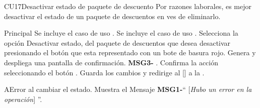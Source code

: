 \begin{UseCase}{CU17}{Desactivar estado de paquete de descuento}{
		Por razones laborales, es mejor desactivar el estado de un paquete de descuentos en ves de eliminarlo.
	}
	\end{UseCase}




	\begin{UCtrayectoria}{Principal}
		\UCpaso Se incluye el caso de uso .
		\UCpaso Se incluye el caso de uso .
		\UCpaso[\UCactor] Selecciona la opción Desactivar estado, del paquete de descuentos que desea desactivar presionando el botón  que esta representado con un bote de basura rojo.		
		\UCpaso Genera y despliega una pantalla de confirmación.  {\bf MSG3-} .
		\UCpaso[\UCactor] Confirma la acción seleccionando el botón . 
		\UCpaso Guarda los cambios y redirige al [\UCactor] a la  .
	\end{UCtrayectoria}




\begin{UCtrayectoriaA}{A}{Error al cambiar el estado.}
			\UCpaso Muestra el Mensaje {\bf MSG1-}`` [{\em Hubo un error en la operación}] ''.
			
		\end{UCtrayectoriaA}
		